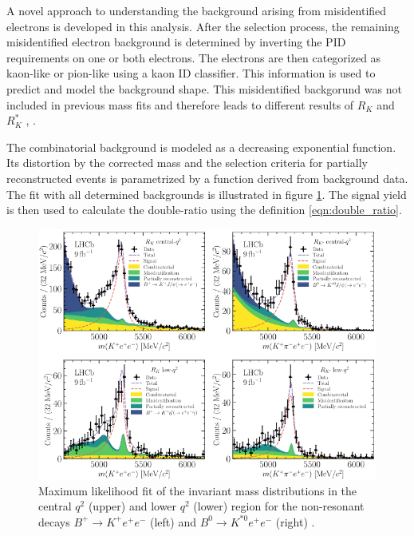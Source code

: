 A novel approach to understanding the background arising from misidentified 
electrons is developed in this analysis. After the selection process, the remaining 
misidentified electron background is determined by inverting the PID requirements 
on one or both electrons. The electrons are then categorized as kaon-like or 
pion-like using a kaon ID classifier. This information is used to predict and model 
the background shape.
This misidentified backgorund was not included in previous mass fits and therefore
leads to different results of $R_K$ and $R_K^*$ \cite{previous_RK}, \cite{previous_RK*}.

The combinatorial background is modeled as a decreasing exponential function.
Its distortion by the corrected mass and the selection criteria for partially 
reconstructed events is parametrized by a function derived from background data.
The fit with all determined backgrounds is illustrated in figure \ref{fig:fits}.
The signal yield is then used to calculate the double-ratio using the definition
\eqref{eqn:double_ratio}.
\begin{figure}
    \centering
    \includegraphics[width=\linewidth]{figures/fits.png}
    \caption{Maximum likelihood fit of the invariant mass distributions in the central $q^2$ (upper) and lower $q^2$ (lower) region for the non-resonant decays $B^+\to K^+e^+e^-$ (left) and $B^0\to K^{*0}e^+e^-$ (right) \cite{lhcbcollaboration2022test}.}
    \label{fig:fits}
\end{figure}

